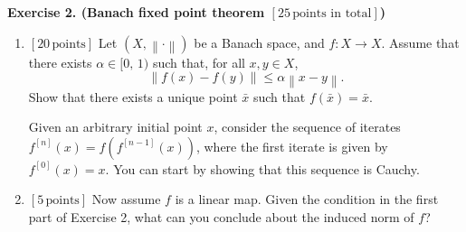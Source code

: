 \documentclass[a4paper,10.5pt]{article}
\begin{document}
\clearpage

{\bf Exercise 2. (Banach fixed point theorem  {\bf$[25\, \text{points in total}]$})}
\begin{enumerate}
\item {\bf$[20\, \text{points}]$} Let $\left(X, \left\lVert\cdot\right\rVert\right)$ be a Banach space, and $f:X\rightarrow X$. Assume that there exists $\alpha\in[0,\, 1)$ such that, for all $x,y\in X$,
\begin{displaymath}
\left\lVert f(x) - f(y) \right\rVert
\leq
\alpha
\left\lVert x - y \right\rVert.
\end{displaymath}
Show that there exists a unique point $\bar{x}$ such that $f(\bar{x}) = \bar{x}$.

Given an arbitrary initial point $x$,
consider the sequence of iterates 
$f^{[n]}(x) = f(f^{[n-1]}(x))$, where the first iterate is given by $f^{[0]}(x)=x$. You can start by showing that this sequence is Cauchy.

\item {\bf$[5\, \text{points}]$} Now assume $f$ is a linear map. Given the condition in the first part of Exercise 2, what can you conclude about the induced norm of $f$?

\end{enumerate}
\end{document}
